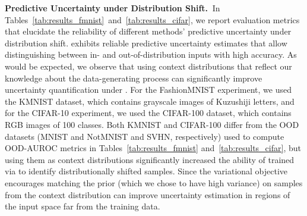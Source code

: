 \textbf{Predictive Uncertainty under Distribution Shift.}$~$
In Tables~\ref{tab:results_fmnist}~and~\ref{tab:results_cifar}, we report evaluation metrics that elucidate the reliability of different methods' predictive uncertainty under distribution shift.
\fsvi exhibits reliable predictive uncertainty estimates that allow distinguishing between in- and out-of-distribution inputs with high accuracy.
%
As would be expected, we observe that using context distributions that reflect our knowledge about the data-generating process can significantly improve uncertainty quantification under \fsvi.
For the FashionMNIST experiment, we used the KMNIST dataset, which contains grayscale images of Kuzushiji letters, and for the CIFAR-10 experiment, we used the CIFAR-100 dataset, which contains RGB images of 100 classes.
Both KMNIST and CIFAR-100 differ from the OOD datasets (MNIST and NotMNIST and SVHN, respectively) used to compute OOD-AUROC metrics in Tables~\ref{tab:results_fmnist} and~\ref{tab:results_cifar}, but using them as context distributions significantly increased the ability of \bnns trained via \fsvi to identify distributionally shifted samples.
Since the variational objective encourages matching the prior (which we chose to have high variance) on samples from the context distribution can improve uncertainty estimation in regions of the input space far from the training data.




%

